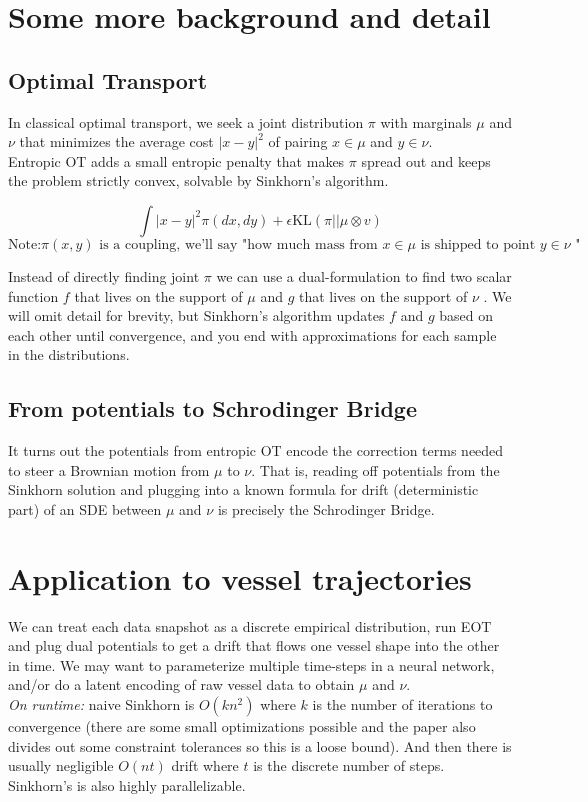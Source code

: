 \documentclass{article}
\begin{document}
\section{Some more background and detail}
\subsection{Optimal Transport}
In classical optimal transport, we seek a joint distribution $\pi$ with marginals $\mu$ and $\nu$ that minimizes the average cost $|x-y|^2$ of pairing $x\in \mu$ and $y\in \nu$. \\
Entropic OT adds a small entropic penalty that makes $\pi$ spread out and keeps the problem strictly convex, solvable by Sinkhorn's algorithm.

$$\int |x-y|^2 \pi (dx, dy) + \epsilon \mathrm{KL}(\pi || \mu  \otimes v)$$
\[\text{Note:$\pi(x,y)$ is a coupling, we'll say "how much mass from $x\in \mu$ is shipped to point $y\in \nu$ "}\]

Instead of directly finding joint $\pi$ we can use a dual-formulation to find two scalar function $f$ that lives on the support of $\mu$ and $g$ that lives on the support of $\nu$ . We will omit detail for brevity, but Sinkhorn's algorithm updates $f$ and $g$ based on each other until convergence, and you end with approximations for each sample in the distributions.\\
\subsection{From potentials to Schrodinger Bridge }
It turns out the potentials from entropic OT encode the correction terms needed to steer a Brownian motion from $\mu$ to $\nu$. That is, reading off potentials from the Sinkhorn solution and plugging into a known formula for drift (deterministic part) of an SDE between $\mu$ and $\nu $ is precisely the Schrodinger Bridge.
\section{Application to vessel trajectories}

We can treat each data snapshot as a discrete empirical distribution, run EOT and plug dual potentials to get a drift that flows one vessel shape into the other in time. We may want to parameterize multiple time-steps in a neural network, and/or do a latent encoding of raw vessel data to obtain $\mu$ and $\nu$.\\

\textit{On runtime:} naive Sinkhorn is $O(kn^2)$ where $k $ is the number of iterations to convergence (there are some small optimizations possible and the paper also divides out some constraint tolerances so this is a loose bound). And then there is usually negligible $O(nt)$ drift where $t$ is the discrete number of steps. Sinkhorn's is also highly parallelizable.
 
\end{document}
